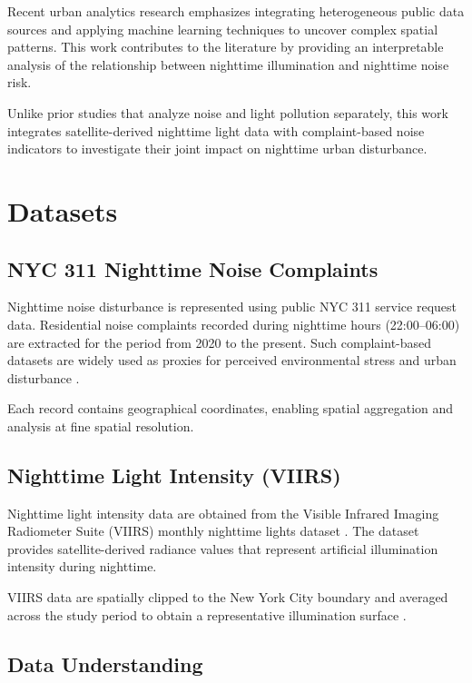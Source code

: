 \documentclass[conference]{IEEEtran}
\begin{document}
Recent urban analytics research emphasizes integrating heterogeneous public data
sources and applying machine learning techniques to uncover complex spatial patterns.
This work contributes to the literature by providing an interpretable analysis of
the relationship between nighttime illumination and nighttime noise risk.

Unlike prior studies that analyze noise and light pollution separately,
this work integrates satellite-derived nighttime light data with
complaint-based noise indicators to investigate their joint impact
on nighttime urban disturbance.

\section{Datasets}

\subsection{NYC 311 Nighttime Noise Complaints}

Nighttime noise disturbance is represented using public NYC 311 service request data.
Residential noise complaints recorded during nighttime hours (22:00--06:00) are
extracted for the period from 2020 to the present.
Such complaint-based datasets are widely used as proxies for perceived environmental
stress and urban disturbance \cite{kontokosta2021bias,kontokosta2016using}.

Each record contains geographical coordinates, enabling spatial aggregation and
analysis at fine spatial resolution.

\subsection{Nighttime Light Intensity (VIIRS)}

Nighttime light intensity data are obtained from the Visible Infrared Imaging Radiometer
Suite (VIIRS) monthly nighttime lights dataset \cite{elvidge2017viirs}.
The dataset provides satellite-derived radiance values that represent artificial
illumination intensity during nighttime.

VIIRS data are spatially clipped to the New York City boundary and averaged across
the study period to obtain a representative illumination surface \cite{elvidge2017viirs}.

\subsection{Data Understanding}
\end{document}
